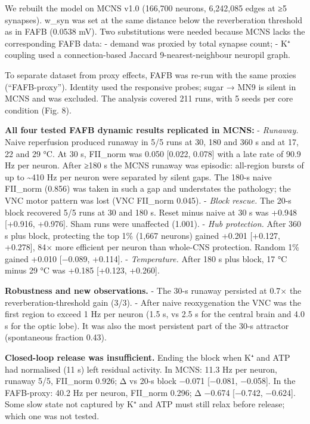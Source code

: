 \documentclass[11pt]{article}
\begin{document}
We rebuilt the model on MCNS v1.0 (166,700 neurons, 6,242,085 edges at ≥5 synapses). w\_syn was set at the same distance below the reverberation threshold as in FAFB (0.0538 mV). Two substitutions were needed because MCNS lacks the corresponding FAFB data:
- demand was proxied by total synapse count;
- K⁺ coupling used a connection-based Jaccard 9-nearest-neighbour neuropil graph.

To separate dataset from proxy effects, FAFB was re-run with the same proxies (``FAFB-proxy''). Identity used the responsive probes; sugar → MN9 is silent in MCNS and was excluded. The analysis covered 211 runs, with 5 seeds per core condition (Fig. 8).

\textbf{All four tested FAFB dynamic results replicated in MCNS:}
- \emph{Runaway.} Naive reperfusion produced runaway in 5/5 runs at 30, 180 and 360 s and at 17, 22 and 29 °C. At 30 s, FII\_norm was 0.050 {[}0.022, 0.078{]} with a late rate of 90.9 Hz per neuron. After ≥180 s the MCNS runaway was episodic: all-region bursts of up to \textasciitilde410 Hz per neuron were separated by silent gaps. The 180-s naive FII\_norm (0.856) was taken in such a gap and understates the pathology; the VNC motor pattern was lost (VNC FII\_norm 0.045).
- \emph{Block rescue.} The 20-s block recovered 5/5 runs at 30 and 180 s. Reset minus naive at 30 s was +0.948 {[}+0.916, +0.976{]}. Sham runs were unaffected (1.001).
- \emph{Hub protection.} After 360 s plus block, protecting the top 1\% (1,667 neurons) gained +0.201 {[}+0.127, +0.278{]}, 84× more efficient per neuron than whole-CNS protection. Random 1\% gained +0.010 {[}−0.089, +0.114{]}.
- \emph{Temperature.} After 180 s plus block, 17 °C minus 29 °C was +0.185 {[}+0.123, +0.260{]}.

\textbf{Robustness and new observations.}
- The 30-s runaway persisted at 0.7× the reverberation-threshold gain (3/3).
- After naive reoxygenation the VNC was the first region to exceed 1 Hz per neuron (1.5 s, vs 2.5 s for the central brain and 4.0 s for the optic lobe). It was also the most persistent part of the 30-s attractor (spontaneous fraction 0.43).

\textbf{Closed-loop release was insufficient.} Ending the block when K⁺ and ATP had normalised (11 s) left residual activity. In MCNS: 11.3 Hz per neuron, runaway 5/5, FII\_norm 0.926; Δ vs 20-s block −0.071 {[}−0.081, −0.058{]}. In the FAFB-proxy: 40.2 Hz per neuron, FII\_norm 0.296; Δ −0.674 {[}−0.742, −0.624{]}. Some slow state not captured by K⁺ and ATP must still relax before release; which one was not tested.
\end{document}
